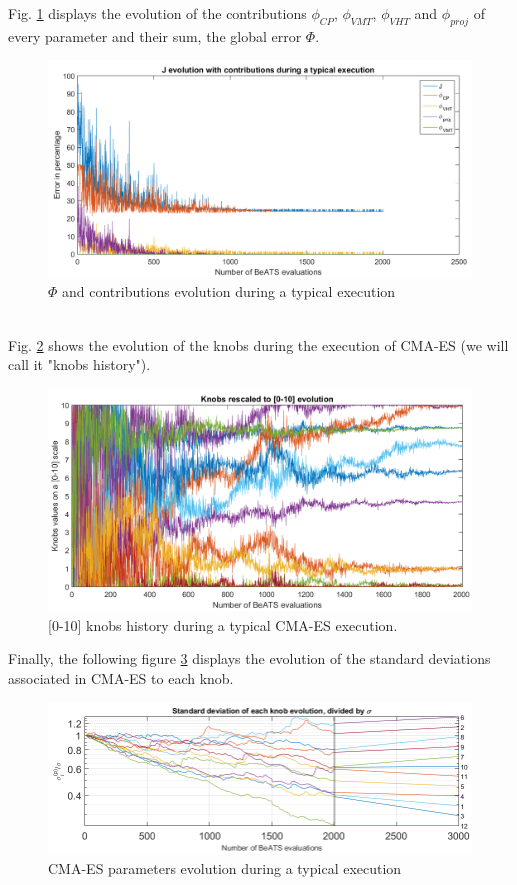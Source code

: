 \newpage
Fig. \ref{fig:contributionsexample} displays the evolution of the contributions $\phi_{CP}$, $\phi_{VMT}$, $\phi_{VHT}$ and $\phi_{proj}$ of every parameter and their sum, the global error $\Phi$.\\
\begin{figure}[!h]
	\caption{$\Phi$ and contributions evolution during a typical execution}
	\label{fig:contributionsexample}
	\includegraphics[width=7in]{figures/results_figures/contributionsexample.png}
\end{figure}	
\\
Fig. \ref{fig:typicalknobs} shows the evolution of the knobs during the execution of CMA-ES (we will call it "knobs history").
\begin{figure}[!h]
	\caption{[0-10] knobs history during a typical CMA-ES execution.}
	\label{fig:typicalknobs}
	\includegraphics[width=7in]{figures/results_figures/typicalknobs.png}
\end{figure}
\newpage
Finally, the following figure \ref{fig:cmaesexample} displays the evolution of the standard deviations associated  in CMA-ES to each knob.
\begin{figure}[!h]
	\caption{CMA-ES parameters evolution during a typical execution}
	\label{fig:cmaesexample}
	\includegraphics[width=7in]{figures/results_figures/cmaesexample.png}
\end{figure}	


